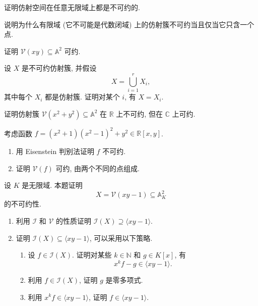 \BookExerciseHeading
\begin{BookExercises}
  \item\label{ex:affine-space-is-irreducible} 证明仿射空间在任意无限域上都是不可约的.
  \item\label{ex:irreducible-varieties-over-finite-fields} 说明为什么有限域 (它不可能是代数闭域) 上的仿射簇不可约当且仅当它只含一个点.
  \item\label{ex:coordinate-axes-variety-reducible} 证明 $\mathcal{V}(xy)\subseteq\mathbb{A}^{2}$ 可约.
  \item\label{ex:irreducible-variety-in-finite-union} 设 $X$ 是不可约仿射簇, 并假设
    \[
      X=\bigcup_{i=1}^{r}X_{i},
    \]
    其中每个 $X_{i}$ 都是仿射簇. 证明对某个 $i$, 有 $X=X_{i}$.
  \item\label{ex:sum-of-squares-real-and-complex-irreducibility} 证明仿射簇 $\mathcal{V}(x^{2}+y^{2})\subseteq\mathbb{A}^{2}$ 在 $\mathbb{R}$ 上不可约, 但在 $\mathbb{C}$ 上可约.
  \item\label{ex:real-irreducible-polynomial-with-reducible-variety} 考虑函数 $f=(x^{2}+1)(x^{2}-1)^{2}+y^{2}\in\mathbb{R}[x,y]$.
    \begin{enumerate}[label=(\alph*)]
      \item 用 Eisenstein 判别法证明 $f$ 不可约.
      \item 证明 $\mathcal{V}(f)$ 可约, 由两个不同的点组成.
    \end{enumerate}
  \item\label{ex:hyperbola-irreducible-over-infinite-field} 设 $K$ 是无限域. 本题证明
    \[
      X=\mathcal{V}(xy-1)\subseteq\mathbb{A}^{2}_{K}
    \]
    的不可约性.
    \begin{enumerate}[label=(\alph*)]
      \item 利用 $\mathcal{I}$ 和 $\mathcal{V}$ 的性质证明 $\mathcal{I}(X)\supseteq\langle xy-1\rangle$.
      \item 证明 $\mathcal{I}(X)\subseteq\langle xy-1\rangle$, 可以采用以下策略.
        \begin{enumerate}[label=\roman*.]
          \item 设 $f\in\mathcal{I}(X)$. 证明对某些 $k\in\mathbb{N}$ 和 $g\in K[x]$, 有
          \[
            x^{k}f-g\in\langle xy-1\rangle.
          \]
          \item 利用 $f\in\mathcal{I}(X)$, 证明 $g$ 是零多项式.
          \item 利用 $x^{k}f\in\langle xy-1\rangle$, 证明 $f\in\langle xy-1\rangle$.
        \end{enumerate}

\end{enumerate}
\end{BookExercises}
